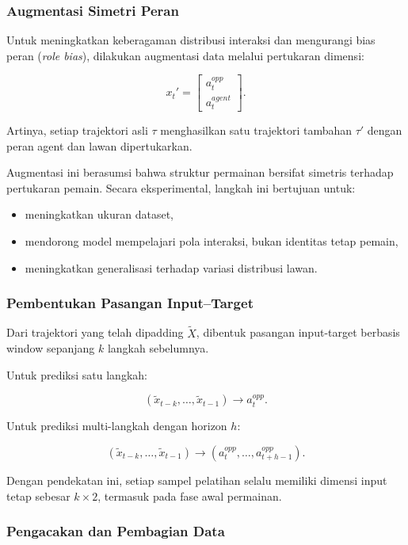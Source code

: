 \subsubsection{Augmentasi Simetri Peran}

Untuk meningkatkan keberagaman distribusi interaksi dan mengurangi bias peran (\textit{role bias}), dilakukan augmentasi data melalui pertukaran dimensi:

\[
x_t' =
\begin{bmatrix}
a_t^{opp} \\
a_t^{agent}
\end{bmatrix}.
\]

Artinya, setiap trajektori asli $\tau$ menghasilkan satu trajektori tambahan $\tau'$ dengan peran agent dan lawan dipertukarkan.

Augmentasi ini berasumsi bahwa struktur permainan bersifat simetris terhadap pertukaran pemain. Secara eksperimental, langkah ini bertujuan untuk:

\begin{itemize}
    \item meningkatkan ukuran dataset,
    \item mendorong model mempelajari pola interaksi, bukan identitas tetap pemain,
    \item meningkatkan generalisasi terhadap variasi distribusi lawan.
\end{itemize}

\subsubsection{Pembentukan Pasangan Input--Target}

Dari trajektori yang telah dipadding $\tilde{X}$, dibentuk pasangan input-target berbasis window sepanjang $k$ langkah sebelumnya.

Untuk prediksi satu langkah:

\[
(\tilde{x}_{t-k}, \dots, \tilde{x}_{t-1}) 
\rightarrow 
a_t^{opp}.
\]

Untuk prediksi multi-langkah dengan horizon $h$:

\[
(\tilde{x}_{t-k}, \dots, \tilde{x}_{t-1}) 
\rightarrow 
(a_t^{opp}, \dots, a_{t+h-1}^{opp}).
\]

Dengan pendekatan ini, setiap sampel pelatihan selalu memiliki dimensi input tetap sebesar $k \times 2$, termasuk pada fase awal permainan.

\subsubsection{Pengacakan dan Pembagian Data}

